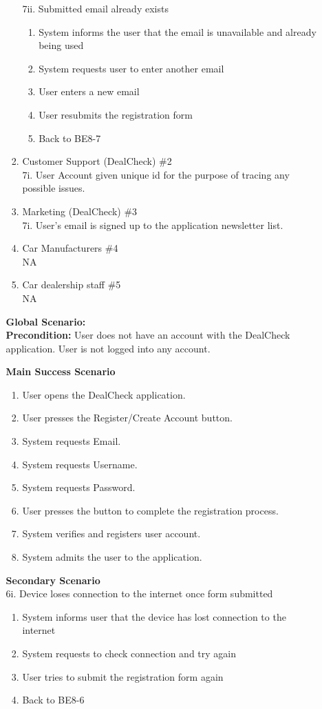 \documentclass[]{article}
\begin{document}
\begin{enumerate}
\begin{enumerate}[{\bf {BE}1.}]
\begin{enumerate}[{\bf VP1.}]
    7ii. Submitted email already exists
    \begin{enumerate}[{7ii}.1]
        \item System informs the user that the email is unavailable and already being used
        \item System requests user to enter another email
        \item User enters a new email
        \item User resubmits the registration form
        \item Back to BE8-7
    \end{enumerate}

    \item Customer Support (DealCheck) \#2 \\
        7i. User Account given unique id for the purpose of tracing any possible issues.
    \item Marketing (DealCheck) \#3 \\
        7i. User’s email is signed up to the application newsletter list.
    \item Car Manufacturers \#4 \\
        NA
    \item Car dealership staff \#5 \\
        NA
\end{enumerate}
{\bf Global Scenario:}\\
{\bf Precondition:} User does not have an account with the DealCheck application. User is not logged into any account.

{\bf Main Success Scenario}
    \begin{enumerate}[1.]
        \item User opens the DealCheck application.
        \item User presses the Register/Create Account button.
        \item System requests Email.
        \item System requests Username.
        \item System requests Password.
        \item User presses the button to complete the registration process.
        \item System verifies and registers user account.
        \item System admits the user to the application.
    \end{enumerate}
    
    {\bf Secondary Scenario} \\
    6i. Device loses connection to the internet once form submitted
    \begin{enumerate}[{6i}.1]
        \item System informs user that the device has lost connection to the internet
        \item System requests to check connection and try again
        \item User tries to submit the registration form again
        \item Back to BE8-6
    \end{enumerate}


\end{enumerate}
\end{enumerate}
\end{document}
